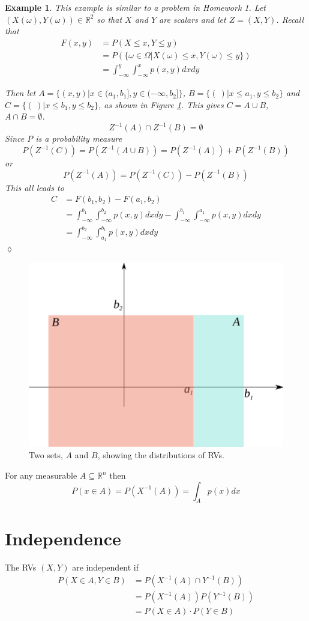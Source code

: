 \documentclass[lecture,12pt,]{pcms-l}
\theoremstyle{example}
\newtheorem{example}{Example}[section]
\begin{document}
\begin{example}
This example is similar to a problem in Homework 1. Let $(X(\omega),Y(\omega)) \in \mathbb{R}^2$ so that $X$ and $Y$ are scalars and let $Z=(X,Y)$. Recall that
\begin{align*}
F(x,y) &= P(X\leq x, Y\leq y) \\
&= P(\lbrace \omega\in\Omega | X(\omega)\leq x, Y(\omega)\leq y\rbrace) \\
&= \int_{-\infty}^y\int_{-\infty}^x p(x,y)dxdy
\end{align*}

Then let $A=\lbrace(x,y) | x\in(a_1,b_1], y\in(-\infty,b_2]\rbrace$, $B=\lbrace(~) | x\leq a_1, y\leq b_2\rbrace$ and $C=\lbrace(~)|x\leq b_1, y\leq b_2\rbrace$, as shown in Figure \ref{fig:02twoSets}. This gives $C=A\cup B$, $A\cap B=\emptyset$.
$$Z^{-1}(A)\cap Z^{-1}(B) = \emptyset$$
Since $P$ is a probability measure
$$P(Z^{-1}(C)) = P(Z^{-1}(A\cup B)) = P(Z^{-1}(A))+P(Z^{-1}(B))$$
or
$$P(Z^{-1}(A))=P(Z^{-1}(C))-P(Z^{-1}(B))$$
This all leads to
\begin{align*}
C &= F(b_1,b_2) - F(a_1,b_2) \\
&= \int_{-\infty}^{b_1}\int_{-\infty}^{b_2} p(x,y)dxdy - \int_{-\infty}^{b_1}\int_{-\infty}^{a_1}p(x,y)dxdy \\
&= \int_{-\infty}^{b_2}\int_{a_1}^{b_1} p(x,y)dxdy
\end{align*}
$\lozenge$
\end{example}
\begin{figure}[ht!]
	\centering
	\includegraphics[width=.35\textwidth]{images/02twoSets}
	\caption{Two sets, $A$ and $B$, showing the distributions of RVs.}
	\label{fig:02twoSets}
\end{figure}

\begin{theorem}
For any measurable $A\subseteq\mathbb{R}^n$ then
$$P(x\in A)=P(X^{-1}(A)) = \int_Ap(x)dx$$
\end{theorem}

\section{Independence}
\begin{definition}
The RVs $(X,Y)$ are independent if
\begin{align*}
P(X\in A, Y\in B) &= P(X^{-1}(A) \cap Y^{-1}(B)) \\
&= P(X^{-1}(A)) P(Y^{-1}(B)) \\
&= P(X\in A) \cdot P(Y\in B)
\end{align*}
\end{definition}
\end{document}
